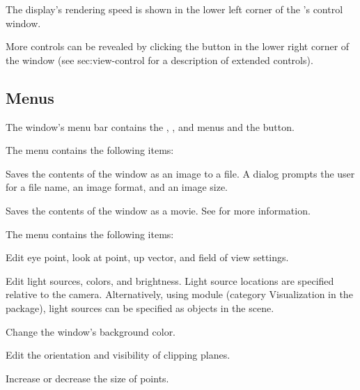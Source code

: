 The display's rendering speed is shown in the lower left corner of the
\viewer{}'s control window.  

More controls can be revealed by clicking the
\latexhtml{\fbox{+}}{\button{[+]}} button in the lower right corner of
the \viewer{} window (see 
{sec:view-control} for a description of extended controls).


\subsection{Menus}

The \viewer{} window's menu bar contains the , ,
and  menus and the  button.

\begin{description}
   The  menu contains the following items:

  \begin{description}
     Saves the contents of the \viewer{}
    window as an image to a file.  A dialog prompts the user for a
    file name, an image format, and an image size.
    
     Saves the contents of the \viewer{}
    window as a movie.  See  for more information.
  \end{description}
  
   The  menu contains the following items:
  \begin{description}
     Edit eye point, look
    at point, up vector, and field of view settings.

     Edit light sources, colors, and
    brightness.  Light source locations are specified relative to the
    camera.  Alternatively, using module  (category
    Visualization in the \sr{} package), light sources can be specified
    as objects in the scene.

     Change the \viewer{}
    window's background color.

     Edit the orientation and visibility
    of clipping planes.

     Increase or decrease the size of points.


\end{description}
\end{description}
